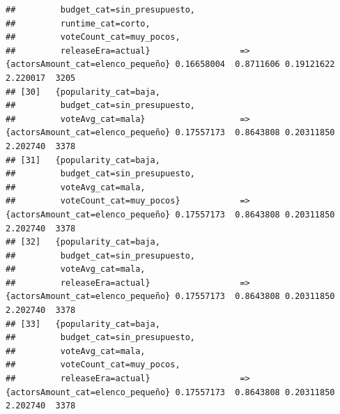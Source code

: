 \documentclass[
]{article}
\begin{document}
\begin{verbatim}
##         budget_cat=sin_presupuesto,                                                                                             
##         runtime_cat=corto,                                                                                                      
##         voteCount_cat=muy_pocos,                                                                                                
##         releaseEra=actual}                  => {actorsAmount_cat=elenco_pequeño} 0.16658004  0.8711606 0.19121622 2.220017  3205
## [30]   {popularity_cat=baja,                                                                                                    
##         budget_cat=sin_presupuesto,                                                                                             
##         voteAvg_cat=mala}                   => {actorsAmount_cat=elenco_pequeño} 0.17557173  0.8643808 0.20311850 2.202740  3378
## [31]   {popularity_cat=baja,                                                                                                    
##         budget_cat=sin_presupuesto,                                                                                             
##         voteAvg_cat=mala,                                                                                                       
##         voteCount_cat=muy_pocos}            => {actorsAmount_cat=elenco_pequeño} 0.17557173  0.8643808 0.20311850 2.202740  3378
## [32]   {popularity_cat=baja,                                                                                                    
##         budget_cat=sin_presupuesto,                                                                                             
##         voteAvg_cat=mala,                                                                                                       
##         releaseEra=actual}                  => {actorsAmount_cat=elenco_pequeño} 0.17557173  0.8643808 0.20311850 2.202740  3378
## [33]   {popularity_cat=baja,                                                                                                    
##         budget_cat=sin_presupuesto,                                                                                             
##         voteAvg_cat=mala,                                                                                                       
##         voteCount_cat=muy_pocos,                                                                                                
##         releaseEra=actual}                  => {actorsAmount_cat=elenco_pequeño} 0.17557173  0.8643808 0.20311850 2.202740  3378

\end{verbatim}
\end{document}
